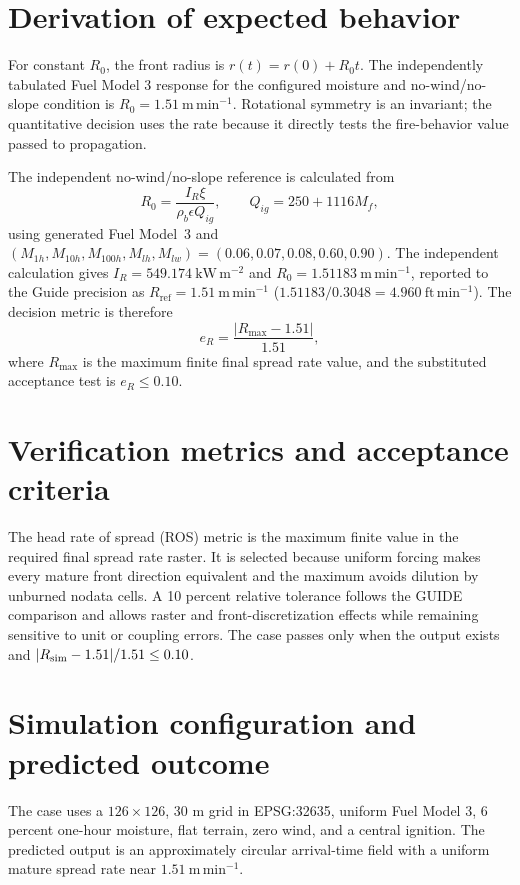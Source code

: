 \section{Derivation of expected behavior}

For constant \(R_0\), the front radius is \(r(t)=r(0)+R_0t\).  The independently tabulated Fuel Model 3 response for the configured moisture and no-wind/no-slope condition is \(R_0=1.51~\mathrm{m\,min^{-1}}\).  Rotational symmetry is an invariant; the quantitative decision uses the rate because it directly tests the fire-behavior value passed to propagation.

The independent no-wind/no-slope reference is calculated from
\[
 R_0=\frac{I_R\xi}{\rho_b\epsilon Q_{ig}},\qquad
 Q_{ig}=250+1116M_f,
\]
using generated Fuel Model~3 and
\((M_{1h},M_{10h},M_{100h},M_{lh},M_{lw})
=(0.06,0.07,0.08,0.60,0.90)\).  The independent calculation gives
\(I_R=549.174~\mathrm{kW\,m^{-2}}\) and
\(R_0=1.51183~\mathrm{m\,min^{-1}}\), reported to the Guide precision as
\(R_{\mathrm{ref}}=1.51~\mathrm{m\,min^{-1}}\)
(\(1.51183/0.3048=4.960~\mathrm{ft\,min^{-1}}\)).
The decision metric is therefore
\[
 e_R=\frac{|R_{\max}-1.51|}{1.51},
\]
where \(R_{\max}\) is the maximum finite final spread rate value, and the
substituted acceptance test is \(e_R\leq0.10\).

\section{Verification metrics and acceptance criteria}

The head rate of spread (ROS) metric is the maximum finite value in the required final spread rate raster.  It is selected because uniform forcing makes every mature front direction equivalent and the maximum avoids dilution by unburned nodata cells.  A 10 percent relative tolerance follows the GUIDE comparison and allows raster and front-discretization effects while remaining sensitive to unit or coupling errors.  The case passes only when the output exists and \(|R_{\rm sim}-1.51|/1.51\le0.10\).

\section{Simulation configuration and predicted outcome}

The case uses a \(126\times126\), 30 m grid in EPSG:32635, uniform Fuel Model 3, 6 percent one-hour moisture, flat terrain, zero wind, and a central ignition.  The predicted output is an approximately circular arrival-time field with a uniform mature spread rate near \(1.51~\mathrm{m\,min^{-1}}\).

